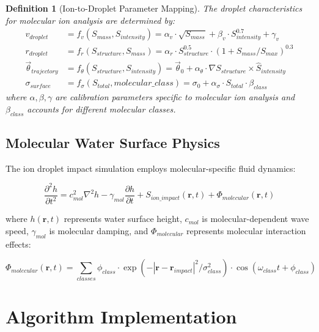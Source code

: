 \documentclass[12pt,a4paper]{article}
\newtheorem{definition}{Definition}
\begin{document}
\begin{definition}[Ion-to-Droplet Parameter Mapping]
The droplet characteristics for molecular ion analysis are determined by:
\begin{align}
v_{droplet} &= f_v(S_{mass}, S_{intensity}) = \alpha_v \cdot \sqrt{S_{mass}} + \beta_v \cdot S_{intensity}^{0.7} + \gamma_v \\
r_{droplet} &= f_r(S_{structure}, S_{mass}) = \alpha_r \cdot S_{structure}^{0.5} \cdot (1 + S_{mass}/S_{max})^{0.3} \\
\vec{\theta}_{trajectory} &= f_\theta(S_{structure}, S_{intensity}) = \vec{\theta}_0 + \alpha_\theta \cdot \nabla S_{structure} \times \hat{S}_{intensity} \\
\sigma_{surface} &= f_\sigma(S_{total}, molecular\_class) = \sigma_0 + \alpha_\sigma \cdot S_{total} \cdot \beta_{class}
\end{align}
where $\alpha, \beta, \gamma$ are calibration parameters specific to molecular ion analysis and $\beta_{class}$ accounts for different molecular classes.
\end{definition}

\subsection{Molecular Water Surface Physics}

The ion droplet impact simulation employs molecular-specific fluid dynamics:

\begin{equation}
\frac{\partial^2 h}{\partial t^2} = c_{mol}^2 \nabla^2 h - \gamma_{mol} \frac{\partial h}{\partial t} + S_{ion\_impact}(\mathbf{r}, t) + \Phi_{molecular}(\mathbf{r}, t)
\end{equation}

where $h(\mathbf{r}, t)$ represents water surface height, $c_{mol}$ is molecular-dependent wave speed, $\gamma_{mol}$ is molecular damping, and $\Phi_{molecular}$ represents molecular interaction effects:

\begin{equation}
\Phi_{molecular}(\mathbf{r}, t) = \sum_{classes} \phi_{class} \cdot \exp(-|\mathbf{r} - \mathbf{r}_{impact}|^2/\sigma_{class}^2) \cdot \cos(\omega_{class} t + \phi_{class})
\end{equation}

\section{Algorithm Implementation}
\end{document}
